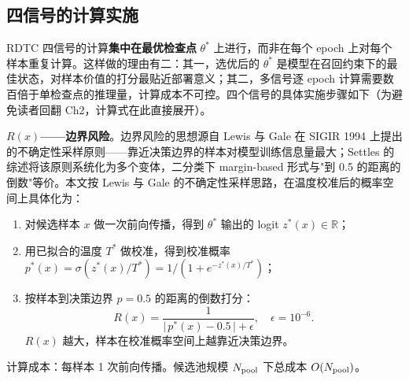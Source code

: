 \documentclass[UTF8,openany,12pt]{ctexbook}
\begin{document}
\subsection{四信号的计算实施}
\label{sec:rdtc-compute}
RDTC 四信号的计算\textbf{集中在最优检查点} $\theta^{\ast}$ 上进行，而非在每个 epoch 上对每个样本重复计算。这样做的理由有二：其一，选优后的 $\theta^{\ast}$ 是模型在召回约束下的最佳状态，对样本价值的打分最贴近部署意义；其二，多信号逐 epoch 计算需要数百倍于单检查点的推理量，计算成本不可控。四个信号的具体实施步骤如下（为避免读者回翻 Ch2，计算式在此直接展开）。

\textbf{$R(x)$——边界风险}。边界风险的思想源自 Lewis 与 Gale\cite{lewis1994sequential} 在 SIGIR 1994 上提出的不确定性采样原则——靠近决策边界的样本对模型训练信息量最大；Settles\cite{settles2009active} 的综述将该原则系统化为多个变体，二分类下 margin-based 形式与"到 0.5 的距离的倒数"等价。本文按 Lewis 与 Gale 的不确定性采样思路，在温度校准后的概率空间上具体化为：
\begin{enumerate}[leftmargin=2em,nosep]
\item 对候选样本 $x$ 做一次前向传播，得到 $\theta^{\ast}$ 输出的 logit $z^{\ast}(x) \in \mathbb{R}$；
\item 用已拟合的温度 $T^{\ast}$ 做校准，得到校准概率 $p^{\ast}(x) = \sigma(z^{\ast}(x) / T^{\ast}) = 1/(1 + e^{-z^{\ast}(x)/T^{\ast}})$；
\item 按样本到决策边界 $p = 0.5$ 的距离的倒数打分：
\begin{equation}
R(x) = \frac{1}{\bigl|\,p^{\ast}(x) - 0.5\,\bigr| + \epsilon}, \quad \epsilon = 10^{-6}.
\label{eq:R-implement}
\end{equation}
$R(x)$ 越大，样本在校准概率空间上越靠近决策边界。
\end{enumerate}
计算成本：每样本 1 次前向传播。候选池规模 $N_{\rm pool}$ 下总成本 $O(N_{\rm pool})$。
\end{document}
